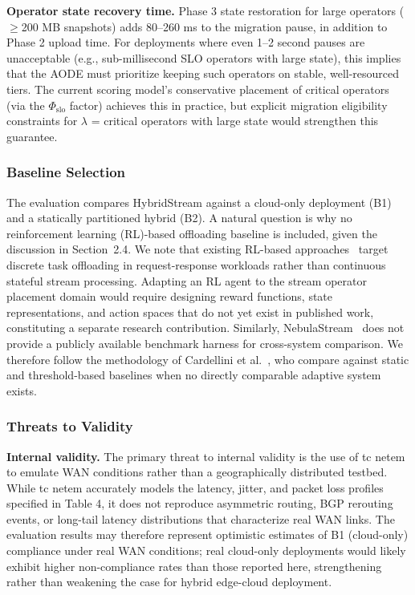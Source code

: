\documentclass[preprint,review,12pt]{elsarticle}
\begin{document}
\textbf{Operator state recovery time.} Phase 3 state restoration for large operators ($\geq$200 MB snapshots) adds 80--260 ms to the migration pause, in addition to Phase 2 upload time. For deployments where even 1--2 second pauses are unacceptable (e.g., sub-millisecond SLO operators with large state), this implies that the AODE must prioritize keeping such operators on stable, well-resourced tiers. The current scoring model's conservative placement of critical operators (via the $\Phi_{\text{slo}}$ factor) achieves this in practice, but explicit migration eligibility constraints for $\lambda$ = critical operators with large state would strengthen this guarantee.

\subsubsection{Baseline Selection}

The evaluation compares HybridStream against a cloud-only deployment (B1) and a statically partitioned hybrid (B2). A natural question is why no reinforcement learning (RL)-based offloading baseline is included, given the discussion in Section~2.4. We note that existing RL-based approaches~\cite{allaoui2024rl,ali2025drl} target discrete task offloading in request-response workloads rather than continuous stateful stream processing. Adapting an RL agent to the stream operator placement domain would require designing reward functions, state representations, and action spaces that do not yet exist in published work, constituting a separate research contribution. Similarly, NebulaStream~\cite{zeuch2020nebulastream} does not provide a publicly available benchmark harness for cross-system comparison. We therefore follow the methodology of Cardellini et al.~\cite{cardellini2016optimal}, who compare against static and threshold-based baselines when no directly comparable adaptive system exists.

\subsubsection{Threats to Validity}\label{threats-to-validity}

\textbf{Internal validity.} The primary threat to internal validity is the use of tc netem to emulate WAN conditions rather than a geographically distributed testbed. While tc netem accurately models the latency, jitter, and packet loss profiles specified in Table 4, it does not reproduce asymmetric routing, BGP rerouting events, or long-tail latency distributions that characterize real WAN links. The evaluation results may therefore represent optimistic estimates of B1 (cloud-only) compliance under real WAN conditions; real cloud-only deployments would likely exhibit higher non-compliance rates than those reported here, strengthening rather than weakening the case for hybrid edge-cloud deployment.
\end{document}
